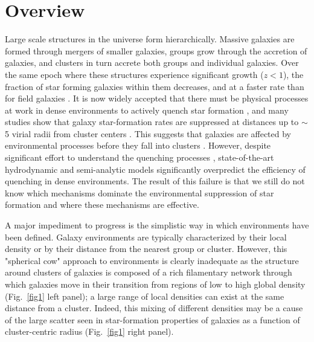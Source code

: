 \documentclass[11pt, preprint]{aastex}
\begin{document}
\section{Overview}
\vspace*{-.4cm}

Large scale structures in the universe form hierarchically. Massive
galaxies are formed through mergers of smaller galaxies, groups grow
through the accretion of galaxies, and clusters in turn accrete both
groups and individual galaxies. Over the same epoch where these
structures experience significant growth ($z<1$), the fraction of star
forming galaxies within them decreases, and at a faster rate than for
field galaxies \citep{Saintonge08,Finn10}.  It is now widely accepted
that there must be physical processes at work in dense
environments to actively quench star formation
\citep[e.g.][]{Lewis02,Balogh04}, and many studies show that galaxy star-formation rates are suppressed at distances up
to $\sim$5 virial radii from cluster centers \citep[see Fig.~\ref{fig1} right
panel; ][]{Lewis02,gomez03, bahe13}.   This suggests that galaxies are
affected by environmental processes before they fall into clusters
\citep[e.g.][]{poggianti99,cortese06}.   However, despite 
significant effort to understand the quenching processes \citep[e.g.][]{Wetzel13},
state-of-the-art hydrodynamic \citep[e.g.][]{Dave11} and semi-analytic
\citep[e.g.][]{guo11a,Hirschmann14} models significantly overpredict
the efficiency of quenching in dense environments.  The result of this
failure is that we still do not know which mechanisms dominate the environmental
suppression of star formation and where these mechanisms are
effective.  

A major impediment to progress is the simplistic way in which
environments have been defined.  Galaxy environments are typically
characterized by their local density or by their distance from the
nearest group or cluster.  However, this "spherical cow" approach to
environments is clearly inadequate as the structure around clusters of
galaxies is composed of a rich filamentary network through which
galaxies move in their transition from regions of low to high global
density (Fig.~\ref{fig1} left panel); a large range of local densities
can exist at the same distance from a cluster. 
Indeed, this mixing of different densities may be a cause of the large scatter seen in star-formation properties of galaxies as a function of cluster-centric radius (Fig.~\ref{fig1} right panel).
\end{document}
